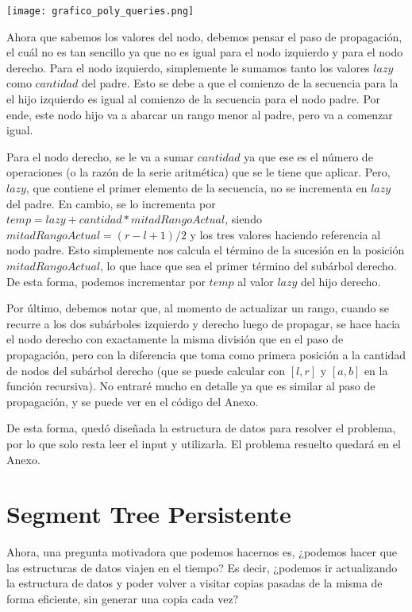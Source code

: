 \documentclass{article}
\begin{document}
\begin{center}
\texttt{[image: grafico\_poly\_queries.png]}
\end{center}

Ahora que sabemos los valores del nodo, debemos pensar el paso de propagación, el cuál no es tan sencillo ya que no es igual para el nodo izquierdo y para el nodo derecho. Para el nodo izquierdo, simplemente le sumamos tanto los valores $lazy$ como $cantidad$ del padre. Esto se debe a que el comienzo de la secuencia para la el hijo izquierdo es igual al comienzo de la secuencia para el nodo padre. Por ende, este nodo hijo va a abarcar un rango menor al padre, pero va a comenzar igual.

Para el nodo derecho, se le va a sumar $cantidad$ ya que ese es el número de operaciones (o la razón de la serie aritmética) que se le tiene que aplicar. Pero, $lazy$, que contiene el primer elemento de la secuencia, no se incrementa en $lazy$ del padre. En cambio, se lo incrementa por $temp = lazy + cantidad * mitadRangoActual$, siendo $mitadRangoActual = (r-l+1)/2$ y los tres valores haciendo referencia al nodo padre. Esto simplemente nos calcula el término de la sucesión en la posición $mitadRangoActual$, lo que hace que sea el primer término del subárbol derecho. De esta forma, podemos incrementar por $temp$ al valor $lazy$ del hijo derecho.

Por último, debemos notar que, al momento de actualizar un rango, cuando se recurre a los dos subárboles izquierdo y derecho luego de propagar, se hace hacia el nodo derecho con exactamente la misma división que en el paso de propagación, pero con la diferencia que toma como primera posición a la cantidad de nodos del subárbol derecho (que se puede calcular con $[l,r]$ y $[a,b]$ en la función recursiva). No entraré mucho en detalle ya que es similar al paso de propagación, y se puede ver en el código del Anexo.

De esta forma, quedó diseñada la estructura de datos para resolver el problema, por lo que solo resta leer el input y utilizarla. El problema resuelto quedará en el Anexo.

\section{Segment Tree Persistente}

Ahora, una pregunta motivadora que podemos hacernos es, ¿podemos hacer que las estructuras de datos viajen en el tiempo? Es decir, ¿podemos ir actualizando la estructura de datos y poder volver a visitar copias pasadas de la misma de forma eficiente, sin generar una copia cada vez? 
\end{document}
